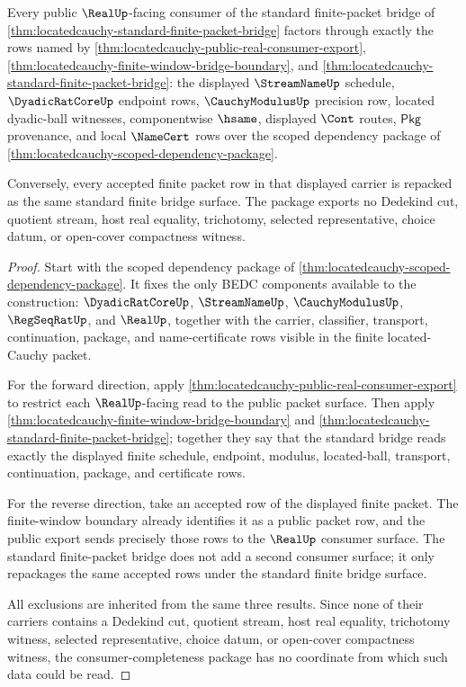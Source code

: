 \begin{theorem}
\label{thm:locatedcauchy-finite-bridge-consumer-completeness}
Every public $\RealUp$-facing consumer of the standard finite-packet bridge of
\autoref{thm:locatedcauchy-standard-finite-packet-bridge} factors through
exactly the rows named by
\autoref{thm:locatedcauchy-public-real-consumer-export},
\autoref{thm:locatedcauchy-finite-window-bridge-boundary}, and
\autoref{thm:locatedcauchy-standard-finite-packet-bridge}: the displayed
$\StreamNameUp$ schedule, $\DyadicRatCoreUp$ endpoint rows,
$\CauchyModulusUp$ precision row, located dyadic-ball witnesses, componentwise
$\hsame$, displayed $\Cont$ routes, $\mathsf{Pkg}$ provenance, and local
$\NameCert$ rows over the scoped dependency package of
\autoref{thm:locatedcauchy-scoped-dependency-package}.

Conversely, every accepted finite packet row in that displayed carrier is
repacked as the same standard finite bridge surface. The package exports no
Dedekind cut, quotient stream, host real equality, trichotomy, selected
representative, choice datum, or open-cover compactness witness.
\end{theorem}
\begin{proof}
Start with the scoped dependency package of
\autoref{thm:locatedcauchy-scoped-dependency-package}. It fixes the only BEDC
components available to the construction: $\DyadicRatCoreUp$, $\StreamNameUp$,
$\CauchyModulusUp$, $\RegSeqRatUp$, and $\RealUp$, together with the carrier,
classifier, transport, continuation, package, and name-certificate rows visible
in the finite located-Cauchy packet.

For the forward direction, apply
\autoref{thm:locatedcauchy-public-real-consumer-export} to restrict each
$\RealUp$-facing read to the public packet surface. Then apply
\autoref{thm:locatedcauchy-finite-window-bridge-boundary} and
\autoref{thm:locatedcauchy-standard-finite-packet-bridge}; together they say
that the standard bridge reads exactly the displayed finite schedule, endpoint,
modulus, located-ball, transport, continuation, package, and certificate rows.

For the reverse direction, take an accepted row of the displayed finite packet.
The finite-window boundary already identifies it as a public packet row, and the
public export sends precisely those rows to the $\RealUp$ consumer surface. The
standard finite-packet bridge does not add a second consumer surface; it only
repackages the same accepted rows under the standard finite bridge surface.

All exclusions are inherited from the same three results. Since none of their
carriers contains a Dedekind cut, quotient stream, host real equality,
trichotomy witness, selected representative, choice datum, or open-cover
compactness witness, the consumer-completeness package has no coordinate from
which such data could be read.
\end{proof}

